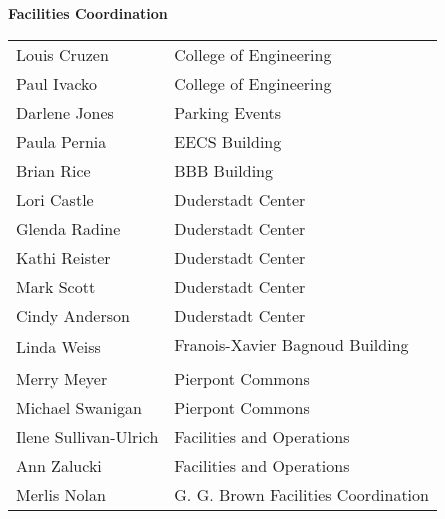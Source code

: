 \documentclass[twoside]{article}
\begin{document}
    { \fontsize{14}{17}\selectfont \bf Facilities Coordination}\\\begin{tabular}{p{2in}l}
    Louis Cruzen	&	 College of Engineering\\
        Paul Ivacko	&	 College of Engineering\\
        Darlene Jones	&	 Parking Events\\
        Paula Pernia	&	 EECS Building\\
        Brian Rice	&	 BBB Building\\
        Lori Castle	&	 Duderstadt Center\\
        Glenda Radine	&	 Duderstadt Center\\
        Kathi Reister	&	 Duderstadt Center\\
        Mark Scott	&	 Duderstadt Center\\
        Cindy Anderson	&	 Duderstadt Center\\
        Linda Weiss	&	 Franois-Xavier Bagnoud Building\\
        Merry Meyer	&	 Pierpont Commons\\
        Michael Swanigan	&	 Pierpont Commons\\
        Ilene Sullivan-Ulrich	&	 Facilities and Operations\\
        Ann Zalucki	&	 Facilities and Operations\\
        Merlis Nolan	&	 G. G. Brown Facilities Coordination\\
        \end{tabular}\\[1em]
    
\end{document}
